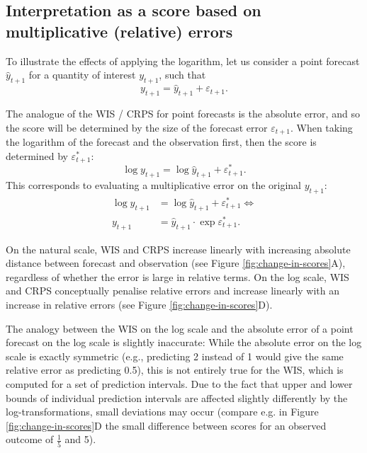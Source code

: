 \documentclass{article}
\begin{document}
\subsection{Interpretation as a score based on multiplicative (relative) errors}

To illustrate the effects of applying the logarithm, let us consider a point forecast $\hat{y}_{t+1}$ for a quantity of interest $y_{t+1}$, such that 
\begin{equation}
y_{t+1} = \hat{y}_{t+1} + \varepsilon_{t+1}.
\end{equation}

The analogue of the WIS / CRPS for point forecasts is the absolute error, and so the score will be determined by the size of the forecast error $\varepsilon_{t+1}$. When taking the logarithm of the forecast and the observation first, then the score is determined by $\varepsilon^*_{t+1}$: 
\begin{equation}
\log y_{t+1} = \log \hat{y}_{t+1} + \varepsilon^*_{t+1}.
\end{equation}
%
This corresponds to evaluating a multiplicative error on the original $y_{t+1}$:
%
\begin{align}
\log y_{t+1} &= \log \hat{y}_{t+1} + \varepsilon^*_{t+1} \Leftrightarrow \\    
y_{t+1} &= \hat{y}_{t+1} \cdot \exp{\varepsilon^*_{t+1}}.    
\end{align}

On the natural scale, WIS and CRPS increase linearly with increasing absolute distance between forecast and observation (see Figure \ref{fig:change-in-scores}A), regardless of whether the error is large in relative terms. On the log scale, WIS and CRPS conceptually penalise relative errors and increase linearly with an increase in relative errors (see Figure \ref{fig:change-in-scores}D). 

The analogy between the WIS on the log scale and the absolute error of a point forecast on the log scale is slightly inaccurate: While the absolute error on the log scale is exactly symmetric (e.g., predicting 2 instead of 1 would give the same relative error as predicting 0.5), this is not entirely true for the WIS, which is computed for a set of prediction intervals. Due to the fact that upper and lower bounds of individual prediction intervals are affected slightly differently by the log-transformations, small deviations may occur (compare e.g. in Figure \ref{fig:change-in-scores}D the small difference between scores for an observed outcome of $\frac{1}{5}$ and 5). 
\end{document}
